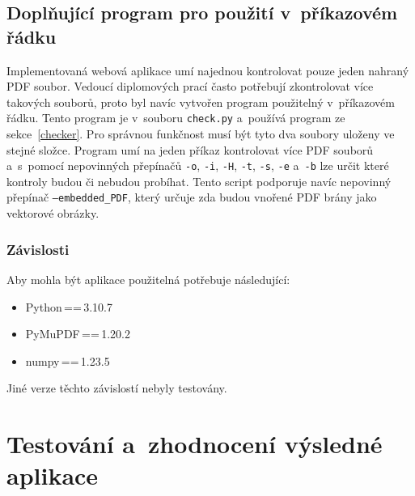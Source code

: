 

\section{Doplňující program pro použití v~příkazovém řádku}

Implementovaná webová aplikace umí najednou kontrolovat pouze jeden nahraný PDF
soubor. Vedoucí diplomových prací často potřebují zkontrolovat více takových
souborů, proto byl navíc vytvořen program použitelný v~příkazovém řádku. 
Tento program je v~souboru \texttt{check.py} a~používá program ze
sekce~\ref{checker}. Pro správnou funkčnost musí být tyto dva soubory uloženy ve
stejné složce. Program umí na jeden příkaz kontrolovat více PDF souborů
a~s~pomocí nepovinných přepínačů \texttt{-o}, \texttt{-i}, \texttt{-H}, 
\texttt{-t}, \texttt{-s}, \texttt{-e} a~\texttt{-b} lze určit které kontroly
budou či nebudou probíhat. Tento script podporuje navíc nepovinný přepínač
\texttt{--embedded\_PDF}, který určuje zda budou vnořené PDF brány jako
vektorové obrázky.


\subsection*{Závislosti}
Aby mohla být aplikace použitelná potřebuje následující:
\begin{itemize}
    \item Python\,==\,3.10.7
    \item PyMuPDF\,==\,1.20.2
    \item numpy\,==\,1.23.5
\end{itemize}
Jiné verze těchto závislostí nebyly testovány.






\chapter{Testování a~zhodnocení výsledné aplikace}

